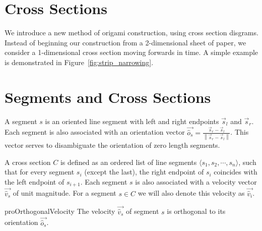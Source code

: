 \section{Cross Sections}
\label{sec:cross_sections}

We introduce a new method of origami construction, using cross section disgrams.
Instead of beginning our construction from a 2-dimensional sheet of paper,
we consider a 1-dimensional cross section moving forwards in time.
A simple example is demonstrated in Figure~\ref{fig:strip_narrowing}.

\section{Segments and Cross Sections}
\label{sec:segments_and_cross_sections}

\begin{definition}
\label{def:segment}
A segment $s$ is an oriented line segment with left and right endpoints $\vec s_l$ and $\vec s_r$.
Each segment is also associated with an orientation vector $\vec{\hat o_s} =\frac{\vec s_r-\vec s_l}{ \left\| \vec s_r-\vec s_l\right\|}$.
This vector serves to disambiguate the orientation of zero length segments.
\end{definition}

\begin{definition}
\label{def:cross_section}
A cross section $C$ is defined as an ordered list of line segments $\langle s_1,s_2,\cdots,s_n\rangle$,
such that for every segment $s_i$ (except the last),
the right endpoint of $s_i$ coincides with the left endpoint of $s_{i+1}$.
Each segment $s$ is also associated with a velocity vector $\vec{\hat v_s}$ of unit magnitude.
For a segment $s\in C$ we will also denote this velocity as $\vec{\hat v_i}$.
\end{definition}

\begin{restatable}{pro}{OrthogonalVelocity}
\label{pro:orthogonal_velocity}
The velocity $\vec{\hat v_s}$ of segment $s$ is orthogonal to its orientation $\vec{\hat o_s}$.
\end{restatable}





%
